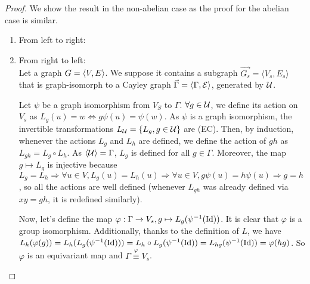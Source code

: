 \begin{proof}
We show the result in the non-abelian case as the proof for the abelian case is similar.
\begin{enumerate}
	\item From left to right:\\

	\item From right to left:\\
Let a graph $G = \langle V, E \rangle$. We suppose it contains a subgraph $\vec{G_s} = \langle V_s, E_s \rangle$ that is graph-isomorph to a Cayley graph $\vec{\Gamma} = \langle \Gamma, \mathcal{E} \rangle$, generated by $\mathcal{U}$.

Let $\psi$ be a graph isomorphism from $V_S$ to $\Gamma$.
$\forall g \in \mathcal{U}$, we define its action on $V_s$ as $L_g(u) = w \Leftrightarrow g\psi(u) = \psi(w)$. As $\psi$ is a graph isomorphism, the invertible transformations $L_{\mathcal{U}} = \{L_g, g \in \mathcal{U} \}$ are (EC). Then, by induction, whenever the actions $L_g$ and $L_h$ are defined, we define the action of $gh$ as $L_{gh}= L_g \circ L_h$. As $\langle \mathcal{U} \rangle = \Gamma$, $L_g$ is defined for all $g \in \Gamma$. Moreover, the map $g \mapsto L_g$ is injective because $L_g = L_h \Rightarrow \forall u \in V, L_g(u) = L_h(u) \Rightarrow \forall u \in V, g\psi(u) = h\psi(u) \Rightarrow g = h$, so all the actions are well defined (\ie whenever $L_{gh}$ was already defined via $xy = gh$, it is redefined similarly).

Now, let's define the map $\varphi: \Gamma \rightarrow V_s, g \mapsto L_g(\psi^{-1}(\operatorname{Id}))$. It is clear that $\varphi$ is a group isomorphism. Additionally, thanks to the definition of $L$, we have $L_h(\varphi(g)) = L_h(L_g(\psi^{-1}(\operatorname{Id}))) = L_h \circ L_g(\psi^{-1}(\operatorname{Id})) = L_{hg}(\psi^{-1}(\operatorname{Id})) = \varphi(hg)$. So $\varphi$ is an equivariant map and $\Gamma \overset{\varphi}{\equiv} V_s$.


\end{enumerate}

\end{proof}







